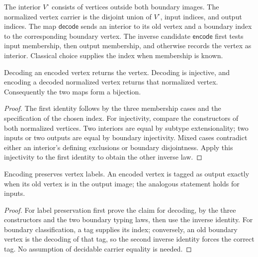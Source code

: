 \begin{definition}
The interior $V^{\circ}$ consists of vertices outside both boundary images.
The normalized vertex carrier is the disjoint union of $V^{\circ}$, input
indices, and output indices. The map $\mathsf{decode}$ sends an interior to
its old vertex and a boundary index to the corresponding boundary vertex.
The inverse candidate $\mathsf{encode}$ first tests input membership, then
output membership, and otherwise records the vertex as interior. Classical
choice supplies the index when membership is known.
\end{definition}



\begin{lemma}
Decoding an encoded vertex returns the vertex. Decoding is injective, and
encoding a decoded normalized vertex returns that normalized vertex.
Consequently the two maps form a bijection.
\end{lemma}
\begin{proof}
The first identity follows by the three membership cases and the specification
of the chosen index. For injectivity, compare the constructors of both
normalized vertices. Two interiors are equal by subtype extensionality;
two inputs or two outputs are equal by boundary injectivity. Mixed cases
contradict either an interior's defining exclusions or boundary disjointness.
Apply this injectivity to the first identity to obtain the other inverse law.
\end{proof}




\begin{lemma}
Encoding preserves vertex labels. An encoded vertex is tagged as output
exactly when its old vertex is in the output image; the analogous statement
holds for inputs.
\end{lemma}
\begin{proof}
For label preservation first prove the claim for decoding, by the three
constructors and the two boundary typing laws, then use the inverse identity.
For boundary classification, a tag supplies its index; conversely, an old
boundary vertex is the decoding of that tag, so the second inverse identity
forces the correct tag. No assumption of decidable carrier equality is needed.
\end{proof}

